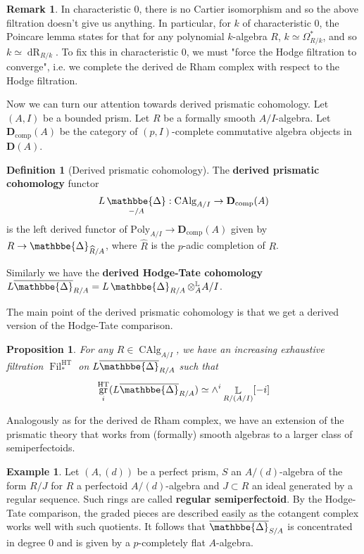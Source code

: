 \documentclass[12pt]{amsproc}
\newtheorem*{prop}{Proposition}
\theoremstyle{definition}
\newtheorem*{definition}{Definition}
\newtheorem*{example}{Example}
\newtheorem*{remark}{Remark}
\newcommand{\tensor}{\otimes}
\newcommand{\htpyeq}{\simeq}
\newcommand{\ra}{\rightarrow}
\DeclareMathOperator{\Fil}{Fil}
\DeclareMathOperator{\prism}{\mathbbe{\Delta}}
\DeclareMathOperator{\gr}{gr}
\DeclareMathOperator{\DerivedL}{\mathbb{L}}
\DeclareMathOperator{\dR}{dR}
\begin{document}
\begin{remark} In characteristic 0, there is no Cartier isomorphism and so the above filtration doesn't give us anything. In particular, for $k$ of characteristic 0, the Poincare lemma states for that for any polynomial $k$-algebra $R$, $k\htpyeq \Omega^*_{R/k}$, and so $k\htpyeq\dR_{R/k}$. To fix this in characteristic 0, we must "force the Hodge filtration to converge", i.e. we complete the derived de Rham complex with respect to the Hodge filtration.
\end{remark}

Now we can turn our attention towards derived prismatic cohomology. Let $(A,I)$ be a bounded prism. Let $R$ be a formally smooth $A/I$-algebra. Let $\textbf{D}_{\text{comp}}(A)$ be the category of $(p,I)$-complete commutative algebra objects in $\textbf{D}(A)$.

\begin{definition}[Derived prismatic cohomology] The \textbf{derived prismatic cohomology} functor 
\[	L\prism_{-/A}: \text{CAlg}_{A/I}\ra \textbf{D}_{\text{comp}}(A)\]
is the left derived functor of $\text{Poly}_{A/I}\ra\textbf{D}_{\text{comp}}(A)$ given by $R\ra \prism_{\widehat{R}/A}$, where $\widehat{R}$ is the $p$-adic completion of $R$.

Similarly we have the \textbf{derived Hodge-Tate cohomology} $L\overline{\prism}_{R/A}=L\prism_{R/A}\tensor^{\DerivedL}_A A/I$.
\end{definition}

The main point of the derived prismatic cohomology is that we get a derived version of the Hodge-Tate comparison.

\begin{prop} For any $R\in\operatorname{CAlg}_{A/I}$, we have an increasing exhaustive filtration $\Fil^{\operatorname{HT}}_*$ on $L\overline{\prism}_{R/A}$ such that
\[	\gr_i^{\operatorname{HT}}(L\overline{\prism}_{R/A}) \htpyeq \wedge^i\DerivedL_{R/(A/I)}[-i]	\]
\end{prop}

Analogously as for the derived de Rham complex, we have an extension of the prismatic theory that works from (formally) smooth algebras to a larger class of semiperfectoids.

\begin{example} Let $(A,(d))$ be a perfect prism, $S$ an $A/(d)$-algebra of the form $R/J$ for $R$ a perfectoid $A/(d)$-algebra and $J\subset R$ an ideal generated by a regular sequence. Such rings are called \textbf{regular semiperfectoid}. By the Hodge-Tate comparison, the graded pieces are described easily as the cotangent complex works well with such quotients. It follows that $\overline{\prism}_{S/A}$ is concentrated in degree 0 and is given by a $p$-completely flat $A$-algebra.
\end{example}
\end{document}
